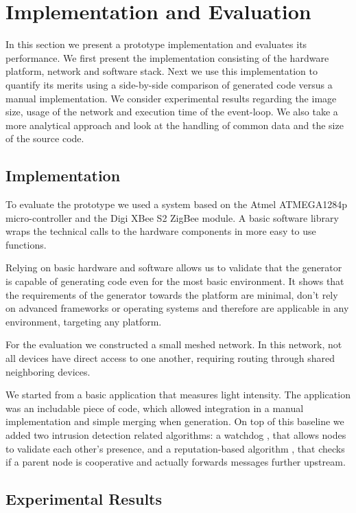 \documentclass[conference]{IEEEtran}
\begin{document}
\section{Implementation and Evaluation}
\label{evaluation}

In this section we present a prototype implementation and evaluates its
performance. We first present the implementation consisting of the hardware
platform, network and software stack. Next we use this implementation to
quantify its merits using a side-by-side comparison of generated code versus a
manual implementation. We consider experimental results regarding the image
size, usage of the network and execution time of the event-loop. We also take a
more analytical approach and look at the handling of common data and the size
of the source code.

\subsection{Implementation}

To evaluate the prototype we used a system based on the Atmel ATMEGA1284p
micro-controller and the Digi XBee S2 ZigBee module. A basic software library
wraps the technical calls to the hardware components in more easy to use
functions.

Relying on basic hardware and software allows us to validate that the generator
is capable of generating code even for the most basic environment. It shows
that the requirements of the generator towards the platform are minimal, don't
rely on advanced frameworks or operating systems and therefore are applicable
in any environment, targeting any platform.

For the evaluation we constructed a small meshed network. In this network, not
all devices have direct access to one another, requiring routing through shared
neighboring devices.

We started from a basic application that measures light intensity. The
application was an includable piece of code, which allowed integration in a
manual implementation and simple merging when generation. On top of this
baseline we added two intrusion detection related algorithms: a
watchdog \cite{mishra2004intrusion}, that allows nodes to validate each other's
presence, and a reputation-based algorithm \cite{ganeriwal2008reputation}, that
checks if a parent node is cooperative and actually forwards messages further
upstream.

\subsection{Experimental Results}
\end{document}
